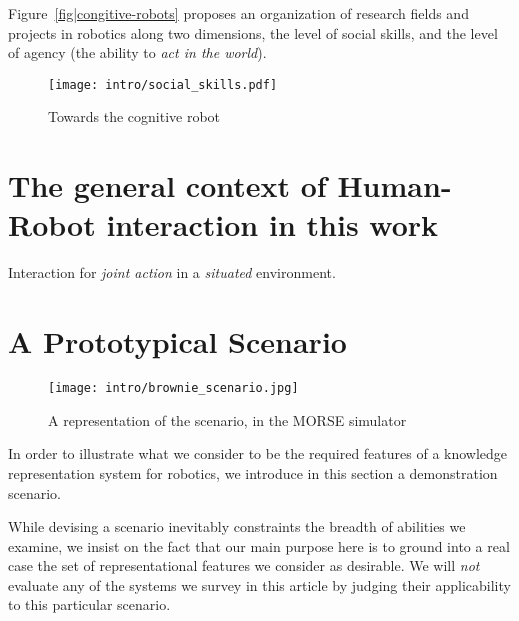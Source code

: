 Figure~\ref{fig|congitive-robots} proposes an organization of research fields
and projects in robotics along two dimensions, the level of social skills, and
the level of agency (the ability to \emph{act in the world}).

\begin{figure}
    \centering
    \texttt{[image: intro/social\_skills.pdf]}
    \caption{Towards the cognitive robot}
    \label{fig|cognitive-robots}
\end{figure}



\section{The general context of Human-Robot interaction in this work}
\label{sect|general-context}

Interaction for \emph{joint action} in a \emph{situated} environment.


\section{A Prototypical Scenario}
\label{sect|scenario}

\begin{figure*}
	\centering
	\texttt{[image: intro/brownie\_scenario.jpg]}
	\caption{A representation of the scenario, in the MORSE simulator}
	\label{fig|scenario}
\end{figure*}

In order to illustrate what we consider to be the required features of a
knowledge representation system for robotics, we introduce in this section a
demonstration scenario.

While devising a scenario inevitably constraints the breadth of abilities we
examine, we insist on the fact that our main purpose here is to ground into a
real case the set of representational features we consider as desirable.  We
will \emph{not} evaluate any of the systems we survey in this article by
judging their applicability to this particular scenario.

